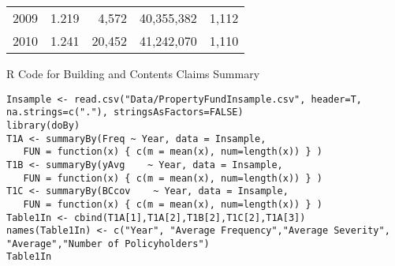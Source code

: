\documentclass[]{book}
\theoremstyle{definition}
\theoremstyle{definition}
\theoremstyle{definition}
\theoremstyle{remark}
\begin{document}
\begin{longtable}[]{@{}lrrrr@{}}
\begin{minipage}[t]{0.17\columnwidth}\raggedright\strut
2009\strut
\end{minipage} & \begin{minipage}[t]{0.14\columnwidth}\raggedleft\strut
1.219\strut
\end{minipage} & \begin{minipage}[t]{0.17\columnwidth}\raggedleft\strut
4,572\strut
\end{minipage} & \begin{minipage}[t]{0.16\columnwidth}\raggedleft\strut
40,355,382\strut
\end{minipage} & \begin{minipage}[t]{0.16\columnwidth}\raggedleft\strut
1,112\strut
\end{minipage}\tabularnewline
\begin{minipage}[t]{0.17\columnwidth}\raggedright\strut
2010\strut
\end{minipage} & \begin{minipage}[t]{0.14\columnwidth}\raggedleft\strut
1.241\strut
\end{minipage} & \begin{minipage}[t]{0.17\columnwidth}\raggedleft\strut
20,452\strut
\end{minipage} & \begin{minipage}[t]{0.16\columnwidth}\raggedleft\strut
41,242,070\strut
\end{minipage} & \begin{minipage}[t]{0.16\columnwidth}\raggedleft\strut
1,110\strut
\end{minipage}\tabularnewline
\bottomrule
\end{longtable}

R Code for Building and Contents Claims Summary

\hypertarget{display.CoverageBC.2}{}
\begin{verbatim}
Insample <- read.csv("Data/PropertyFundInsample.csv", header=T, na.strings=c("."), stringsAsFactors=FALSE)
library(doBy)
T1A <- summaryBy(Freq ~ Year, data = Insample, 
   FUN = function(x) { c(m = mean(x), num=length(x)) } )
T1B <- summaryBy(yAvg    ~ Year, data = Insample,   
   FUN = function(x) { c(m = mean(x), num=length(x)) } )
T1C <- summaryBy(BCcov    ~ Year, data = Insample,   
   FUN = function(x) { c(m = mean(x), num=length(x)) } )
Table1In <- cbind(T1A[1],T1A[2],T1B[2],T1C[2],T1A[3])
names(Table1In) <- c("Year", "Average Frequency","Average Severity", "Average","Number of Policyholders")
Table1In
\end{verbatim}
\end{document}
